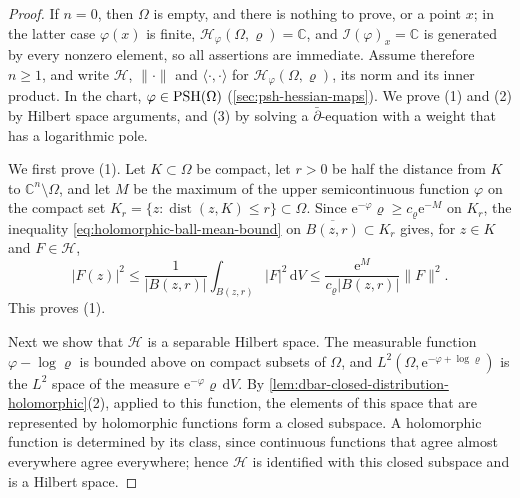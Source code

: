 \begin{proof}
If $n=0$, then $\Omega$ is empty, and there is nothing to prove, or a point $x$; in the latter case $\varphi(x)$ is finite, $\mathcal H_\varphi(\Omega,\varrho)=\mathbb C$, and $\mathcal I(\varphi)_x=\mathbb C$ is generated by every nonzero element, so all assertions are immediate. Assume therefore $n\geq1$, and write $\mathcal H$, $\|\cdot\|$ and $\langle\cdot,\cdot\rangle$ for $\mathcal H_\varphi(\Omega,\varrho)$, its norm and its inner product. In the chart, $\varphi\in\mathrm{PSH}(\Omega)$ (\cref{sec:psh-hessian-maps}). We prove (1) and (2) by Hilbert space arguments, and (3) by solving a $\bar\partial$-equation with a weight that has a logarithmic pole.

We first prove (1). Let $K\subset\Omega$ be compact, let $r>0$ be half the distance from $K$ to $\mathbb C^n\setminus\Omega$, and let $M$ be the maximum of the upper semicontinuous function $\varphi$ on the compact set $K_r=\{z:\operatorname{dist}(z,K)\leq r\}\subset\Omega$. Since $\mathrm e^{-\varphi}\varrho\geq c_\varrho\mathrm e^{-M}$ on $K_r$, the inequality \eqref{eq:holomorphic-ball-mean-bound} on $\overline{B(z,r)}\subset K_r$ gives, for $z\in K$ and $F\in\mathcal H$,
\[
 |F(z)|^2\leq\frac1{|B(z,r)|}\int_{B(z,r)}|F|^2\,\mathrm dV\leq\frac{\mathrm e^M}{c_\varrho|B(z,r)|}\|F\|^2.
\]
This proves (1).

Next we show that $\mathcal H$ is a separable Hilbert space. The measurable function $\varphi-\log\varrho$ is bounded above on compact subsets of $\Omega$, and $L^2(\Omega,\mathrm e^{-\varphi+\log\varrho})$ is the $L^2$ space of the measure $\mathrm e^{-\varphi}\varrho\,\mathrm dV$. By \cref{lem:dbar-closed-distribution-holomorphic}(2), applied to this function, the elements of this space that are represented by holomorphic functions form a closed subspace. A holomorphic function is determined by its class, since continuous functions that agree almost everywhere agree everywhere; hence $\mathcal H$ is identified with this closed subspace and is a Hilbert space.


\end{proof}
